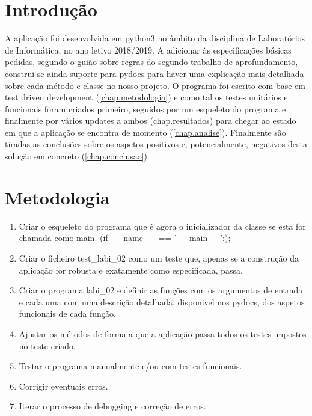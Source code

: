 \documentclass{report}
\begin{document}
\tableofcontents


\clearpage
{}

\chapter{Introdução}
\label{chap.introducao}

A aplicação foi desenvolvida em python3 no âmbito da disciplina de Laboratórios de Informática, no ano letivo 2018/2019. A adicionar às especificações básicas pedidas, segundo o guião sobre regras do segundo trabalho de aprofundamento, construi-se ainda suporte para pydocs para haver uma explicação mais detalhada sobre cada método e classe no nosso projeto. O programa foi escrito com base em test driven development (\autoref{chap.metodologia}) e como tal os testes unitários e funcionais foram criados primeiro, seguidos por um esqueleto do programa e finalmente por vários updates a ambos ({chap.resultados}) para chegar ao estado em que a aplicação se encontra de momento (\autoref{chap.analise}). Finalmente são tiradas as conclusões sobre os aspetos positivos e, potencialmente, negativos desta solução em concreto (\autoref{chap.conclusao})


\chapter{Metodologia}
\label{chap.metodologia}

\begin{enumerate}
	\item Criar o esqueleto do programa que é agora o inicializador da classe se esta for chamada como main. (if \_\_name\_\_ == '\_\_main\_\_':);
	\item Criar o ficheiro test\_labi\_02 como um teste que, apenas se a construção da aplicação for robusta e exatamente como especificada, passa.
	\item Criar o programa labi\_02 e definir as funções com os argumentos de entrada e cada uma com uma descrição detalhada, disponivel nos pydocs, dos aspetos funcionais de cada função.
	\item Ajustar os métodos de forma a que a aplicação passa todos os testes impostos no teste criado.
	\item Testar o programa manualmente e/ou com testes funcionais.
	\item Corrigir eventuais erros.
	\item Iterar o processo de debugging e correção de erros.
\end{enumerate}
\end{document}
